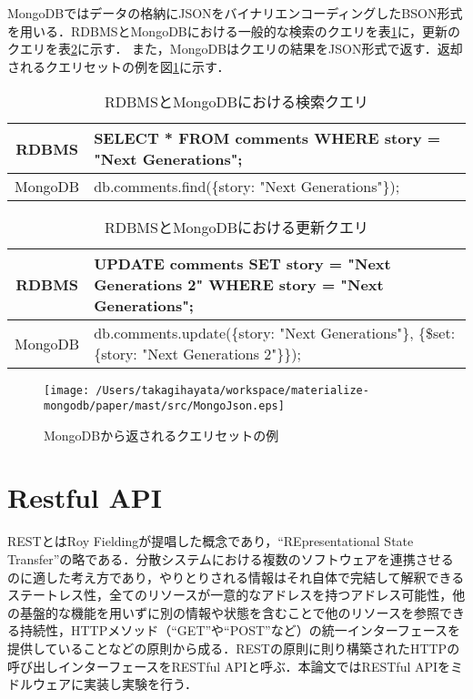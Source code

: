 \documentclass[a4paper,11pt]{ujreport}
\begin{document}
MongoDBではデータの格納にJSONをバイナリエンコーディングしたBSON形式を用いる\cite{Harrison201512}．RDBMSとMongoDBにおける一般的な検索のクエリを表\ref{table:RDB_Mongo_Find}に，更新のクエリを表\ref{table:RDB_Mongo_Update}に示す．
また，MongoDBはクエリの結果をJSON形式で返す．返却されるクエリセットの例を図\ref{MongoJson}に示す．
\begin{table}[htb]
  \begin{center}
    \caption{RDBMSとMongoDBにおける検索クエリ}
		\label{table:RDB_Mongo_Find}
    \begin{tabular}{|c|l|} \hline
			RDBMS & SELECT * FROM comments WHERE story = "Next Generations";\\ \hline
			MongoDB & db.comments.find(\{story: "Next Generations"\});\\ \hline
    \end{tabular}
  \end{center}
\end{table}
\begin{table}[htb]
  \begin{center}
    \caption{RDBMSとMongoDBにおける更新クエリ}
		\label{table:RDB_Mongo_Update}
    \begin{tabular}{|c|l|} \hline
			RDBMS & UPDATE comments SET story = "Next Generations 2" WHERE story = "Next Generations";\\ \hline
			MongoDB & db.comments.update(\{story: "Next Generations"\}, \{\$set: \{story: "Next Generations 2"\}\});\\ \hline
    \end{tabular}
  \end{center}
\end{table}

\begin{figure}[htbp]
	\begin{center}
		\texttt{[image: /Users/takagihayata/workspace/materialize-mongodb/paper/mast/src/MongoJson.eps]} %
	\end{center}
	\caption{MongoDBから返されるクエリセットの例}
	\label{MongoJson}
\end{figure}



\section{Restful API}
RESTとはRoy Fieldingが提唱した概念であり\cite{fielding2000architectural}，“REpresentational State Transfer”の略である．分散システムにおける複数のソフトウェアを連携させるのに適した考え方であり，やりとりされる情報はそれ自体で完結して解釈できるステートレス性，全てのリソースが一意的なアドレスを持つアドレス可能性，他の基盤的な機能を用いずに別の情報や状態を含むことで他のリソースを参照できる持続性，HTTPメソッド（“GET”や“POST”など）の統一インターフェースを提供していることなどの原則から成る．RESTの原則に則り構築されたHTTPの呼び出しインターフェースをRESTful APIと呼ぶ．本論文ではRESTful APIをミドルウェアに実装し実験を行う．
\end{document}
